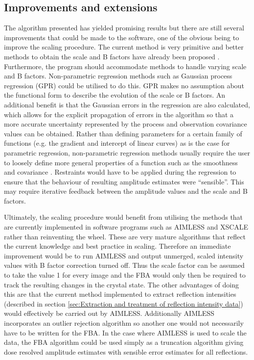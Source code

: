 \subsection{Improvements and extensions}
\label{sub:Improvements and Extensions}
The algorithm presented has yielded promising results but there are still several improvements that could be made to the software, one of the obvious being to improve the scaling procedure.
The current method is very primitive and better methods to obtain the scale and B factors have already been proposed \cite{popov2003}.
Furthermore, the program should accommodate methods to handle varying scale and B factors.
Non-parametric regression methods such as Gaussian process regression (GPR) could be utilised to do this.
GPR makes no assumption about the functional form to describe the evolution of the scale or B factors.
An additional benefit is that the Gaussian errors in the regression are also calculated, which allows for the explicit propagation of errors in the algorithm so that a more accurate uncertainty represented by the process and observation covariance values can be obtained.
Rather than defining parameters for a certain family of functions (e.g. the gradient and intercept of linear curves) as is the case for parametric regression, non-parametric regression methods usually require the user to loosely define more general properties of a function such as the smoothness and covariance \cite{rasmussen2006gaussian}.
Restraints would have to be applied during the regression to ensure that the behaviour of resulting amplitude estimates were ``sensible''.
This may require iterative feedback between the amplitude values and the scale and B factors.

Ultimately, the scaling procedure would benefit from utilising the methods that are currently implemented in software programs such as AIMLESS and XSCALE rather than reinventing the wheel.
These are very mature algorithms that reflect the current knowledge and best practice in scaling.
Therefore an immediate improvement would be to run AIMLESS and output unmerged, scaled intensity values with B factor correction turned off.
Thus the scale factor can be assumed to take the value 1 for every image and the FBA would only then be required to track the resulting changes in the crystal state.
The other advantages of doing this are that the current method implemented to extract reflection intensities (described in section \ref{sec:Extraction and treatment of reflection intensity data}) would effectively be carried out by AIMLESS.
Additionally AIMLESS incorporates an outlier rejection algorithm so another one would not necessarily have to be written for the FBA.
In the case where AIMLESS is used to scale the data, the FBA algorithm could be used simply as a truncation algorithm giving dose resolved amplitude estimates with sensible error estimates for all reflections.

